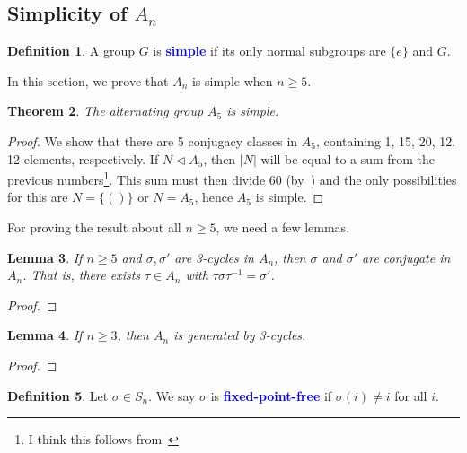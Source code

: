 \documentclass[12pt]{report}
\newcommand{\indx}[1]{\index{#1}\textbf{\textcolor{blue}{#1}}}
\newtheorem{theorem}{Theorem}[section] %
\newtheorem{lemma}[theorem]{Lemma}
\theoremstyle{definition}
\newtheorem{definition}[theorem]{Definition}
\begin{document}
\subsection{Simplicity of \(A_{n}\)}

\begin{definition}
  A group \(G\) is \indx{simple} if its only normal subgroups are \(\{e\}\) and \(G\).
\end{definition}

In this section, we prove that \(A_{n}\) is simple when \(n \geq 5\).

\begin{theorem}\label{thm:group-theory:A5-is-simple}
  The alternating group \(A_{5}\) is simple.
\end{theorem}

\begin{proof}
  We show that there are 5 conjugacy classes in \(A_{5}\), containing 1, 15, 20, 12, 12 elements, respectively. If \(N \triangleleft A_{5}\), then \(|N|\) will be equal to a sum from the previous numbers\footnote{I think this follows from~}. This sum must then divide 60 (by~) and the only possibilities for this are \(N = \{()\}\) or \(N = A_{5}\), hence \(A_{5}\) is simple.
\end{proof}

For proving the result about all \(n \geq 5\), we need a few lemmas.

\begin{lemma}
  If \(n \geq 5\) and \(\sigma, \sigma'\) are 3-cycles in \(A_{n}\), then \(\sigma\) and \(\sigma'\) are conjugate in \(A_{n}\). That is, there exists \(\tau \in A_{n}\) with \(\tau \sigma \tau^{-1} = \sigma'\).
\end{lemma}

\begin{proof}
\end{proof}

\begin{lemma}
  If \(n \geq 3\), then \(A_{n}\) is generated by 3-cycles.
\end{lemma}

\begin{proof}
\end{proof}

\begin{definition}
  Let \(\sigma \in S_{n}\). We say \(\sigma\) is \indx{fixed-point-free} if \(\sigma(i) \neq i\) for all \(i\).
\end{definition}
\end{document}
